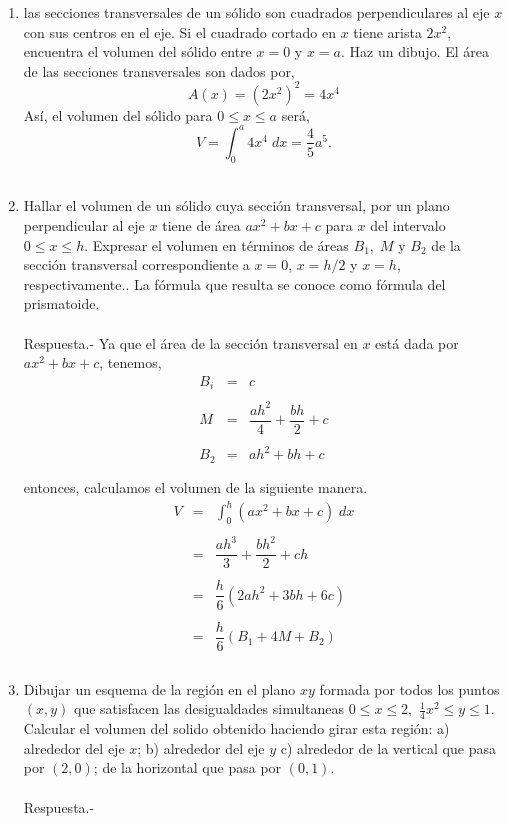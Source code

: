 \begin{enumerate}[ \bfseries 1.]
    \item las secciones transversales de un sólido son cuadrados perpendiculares al eje $x$ con sus centros en el eje. Si el cuadrado cortado en $x$ tiene arista $2x^2$, encuentra el volumen del sólido entre $x = 0$ y $x = a$. Haz un dibujo.
	El área de las secciones transversales son dados por,
	$$A(x) = (2x^2)^2 = 4x^4$$
	Así, el volumen del sólido para $0\leq x \leq a$ será,
	$$V=\int_0^a 4x^4\; dx = \dfrac{4}{5}a^5.$$\\

    \item Hallar el volumen de un sólido cuya sección transversal, por un plano perpendicular al eje $x$ tiene de área $ax^2+bx+c$ para $x$ del intervalo $0\leq x\leq h$. Expresar el volumen en términos de áreas $B_1,\; M$ y $B_2$ de la sección transversal correspondiente a $x=0$, $x=h/2$ y $x=h$, respectivamente.. La fórmula que resulta se conoce como fórmula del prismatoide.\\\\
	Respuesta.-\; Ya que el área de la sección transversal en $x$ está dada por $ax^2+bx+c$, tenemos,
	$$\begin{array}{rcl}
	    B_i&=&c\\\\
	      M&=&\dfrac{ah^2}{4}+\dfrac{bh}{2}+c\\\\
	    B_2&=&ah^2 + bh + c\\\\
	\end{array}$$
	entonces, calculamos el volumen de la siguiente manera.
	$$\begin{array}{rcl}
	    V&=&\displaystyle\int_0^h (ax^2 + bx + c)\; dx\\\\
	     &=&\dfrac{ah^3}{3} + \dfrac{bh^2}{2} + ch\\\\
	     &=&\dfrac{h}{6}(2ah^2 + 3bh + 6c)\\\\
	     &=&\dfrac{h}{6} (B_1 + 4M + B_2)\\\\
	\end{array}$$
	\vspace{0.5cm}

    \item Dibujar un esquema de la región en el plano $xy$ formada por todos los puntos $(x,y)$ que satisfacen las desigualdades simultaneas $0\leq x\leq 2,$  $\frac{1}{4}x^2 \leq y \leq 1$. Calcular el volumen del solido obtenido haciendo girar esta región: a) alrededor del eje $x$; b) alrededor del eje $y$ c) alrededor de la vertical que pasa por $(2,0)$; de la horizontal que pasa por $(0,1)$.\\\\
	Respuesta.-\; 


\end{enumerate}
